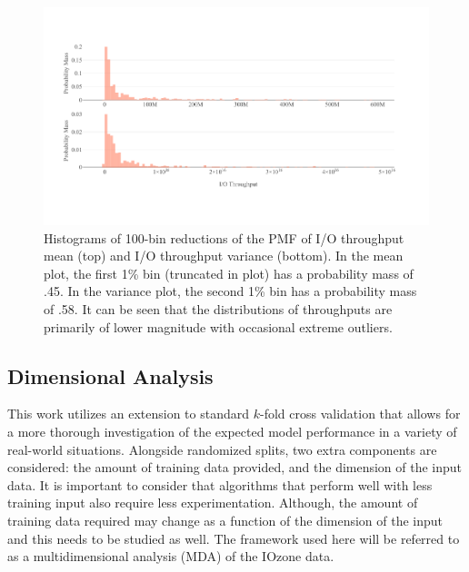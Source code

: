 \documentclass{scspaperproc}
\theoremstyle{scsthe}
\begin{document}
\begin{figure}
  \centering
  \includegraphics[width=\textwidth,trim={0 .5in 0 .4in}]{Raw_Throughput.pdf}
  \caption{Histograms of 100-bin reductions of the PMF of I/O
    throughput mean (top) and I/O throughput variance (bottom). In the
    mean plot, the first 1\% bin (truncated in plot) has a probability
    mass of .45. In the variance plot, the second 1\% bin has a
    probability mass of .58. It can be seen that the distributions of
    throughputs are primarily of lower magnitude with occasional
    extreme outliers.}
  \label{fig:raw_throughput}
\end{figure}

\vspace{-10pt}
\subsection{Dimensional Analysis}
\vspace{-10pt}
This work utilizes an extension to standard $k$-fold cross validation
that allows for a more thorough investigation of the expected model
performance in a variety of real-world situations. Alongside
randomized splits, two extra components are considered: the amount of
training data provided, and the dimension of the input data. It is
important to consider that algorithms that perform well with less
training input also require less experimentation. Although, the amount
of training data required may change as a function of the dimension of
the input and this needs to be studied as well. The framework used
here will be referred to as a multidimensional analysis (MDA) of the
IOzone data.

\end{document}
